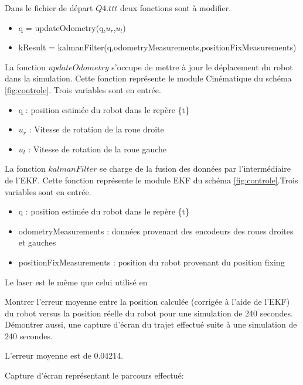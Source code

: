 \documentclass[addpoints]{exam}
\begin{document}
\begin{questions}
Dans le fichier de départ $Q4.ttt$ deux fonctions sont à modifier.
\begin{itemize}
    \item     q = updateOdometry(q,$u_r$,$u_l$)
    \item kResult = kalmanFilter(q,odometryMeasurements,positionFixMeasurements)
\end{itemize}

La fonction $updateOdometry$ s'occupe de mettre à jour le déplacement du robot dans la simulation. Cette fonction représente le module Cinématique du schéma \ref{fig:controle}. Trois variables sont en entrée.

\begin{itemize}
    \item q : position estimée du robot dans le repère \{t\}
    \item $u_r$ :  Vitesse de rotation de la roue droite
    \item $u_l$ : Vitesse de rotation de la roue gauche 
\end{itemize}

La fonction $kalmanFilter$ se charge de la fusion des données par l'intermédiaire de l'EKF. Cette fonction représente le module EKF du schéma \ref{fig:controle}.Trois variables sont en entrée.

\begin{itemize}
    \item q : position estimée du robot dans le repère \{t\}
    \item odometryMeasurements : données provenant des encodeurs des roues droites et gauches
    \item positionFixMeasurements : position du robot provenant du position fixing
\end{itemize}

Le laser est le même que celui utilisé en

Montrer l'erreur moyenne entre la position calculée (corrigée à l'aide de l'EKF) du robot versus la position réelle du robot pour une simulation de 240 secondes. Démontrer aussi, une capture d'écran du trajet effectué suite à une simulation de 240 secondes.

\begin{solution}
L'erreur moyenne est de 0.04214.\vspace{3mm}

Capture d'écran représentant le parcours effectué: 


\end{solution}
\end{questions}
\end{document}
